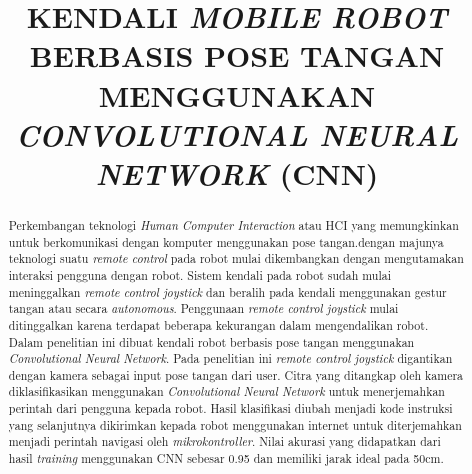 \documentclass[conference]{IEEEtran}
\begin{document}
\title{KENDALI \emph{MOBILE ROBOT} BERBASIS POSE TANGAN MENGGUNAKAN \emph{CONVOLUTIONAL NEURAL NETWORK} (CNN)
}

\author{
\and
{}
\and
{}
}

\maketitle

\begin{abstract}
    Perkembangan teknologi \textit{Human Computer Interaction} atau HCI yang memungkinkan untuk berkomunikasi dengan komputer menggunakan pose tangan.dengan majunya teknologi suatu \textit{remote control} pada robot mulai dikembangkan dengan mengutamakan interaksi pengguna dengan robot. Sistem kendali pada robot sudah mulai meninggalkan \textit{remote control joystick} dan beralih pada kendali menggunakan gestur tangan atau secara \textit{autonomous}. Penggunaan \textit{remote control joystick} mulai ditinggalkan karena terdapat beberapa kekurangan dalam mengendalikan robot. Dalam penelitian ini dibuat kendali robot berbasis pose tangan menggunakan \textit{Convolutional Neural Network}. Pada penelitian ini \textit{remote control joystick} digantikan dengan kamera sebagai input pose tangan dari user. Citra yang ditangkap oleh kamera diklasifikasikan menggunakan \textit{Convolutional Neural Network} untuk menerjemahkan perintah dari pengguna kepada robot. Hasil klasifikasi diubah menjadi kode instruksi yang selanjutnya dikirimkan kepada robot menggunakan internet untuk diterjemahkan menjadi perintah navigasi oleh \textit{mikrokontroller}. Nilai akurasi yang didapatkan dari hasil \emph{training} menggunakan CNN sebesar 0.95 dan memiliki jarak ideal pada 50cm.
\end{abstract}
\end{document}
